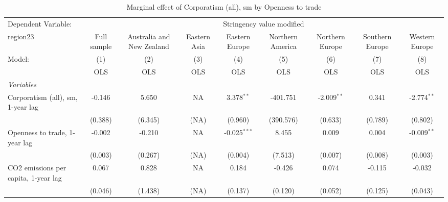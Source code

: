 
\begin{table}[htbp]
   \caption{Marginal effect of Corporatism (all), sm by Openness to trade}
   \centering
   \begin{tabular}{lcccccccc}
      \toprule
      Dependent Variable: & \multicolumn{8}{c}{Stringency value modified}\\
      region23                                                          & Full sample   & Australia and New Zealand & Eastern Asia & Eastern Europe & Northern America & Northern Europe & Southern Europe & Western Europe \\   
      Model:                                                            & (1)           & (2)                       & (3)          & (4)            & (5)              & (6)             & (7)             & (8)\\  
                                                                        &  OLS          & OLS                       & OLS          & OLS            & OLS              & OLS             & OLS             & OLS\\  
      \midrule
      \emph{Variables}\\
      Corporatism (all), sm, 1-year lag                                 & -0.146        & 5.650                     & NA           & 3.378$^{**}$   & -401.751         & -2.009$^{**}$   & 0.341           & -2.774$^{**}$\\   
                                                                        & (0.388)       & (6.345)                   & (NA)         & (0.960)        & (390.576)        & (0.633)         & (0.789)         & (0.802)\\   
      Openness to trade, 1-year lag                                     & -0.002        & -0.210                    & NA           & -0.025$^{***}$ & 8.455            & 0.009           & 0.004           & -0.009$^{**}$\\   
                                                                        & (0.003)       & (0.267)                   & (NA)         & (0.004)        & (7.513)          & (0.007)         & (0.008)         & (0.003)\\   
      CO2 emissions per capita, 1-year lag                              & 0.067         & 0.828                     & NA           & 0.184          & -0.426           & 0.074           & -0.115          & -0.032\\   
                                                                        & (0.046)       & (1.438)                   & (NA)         & (0.137)        & (0.120)          & (0.052)         & (0.125)         & (0.043)\\   

\end{tabular}
\end{table}
